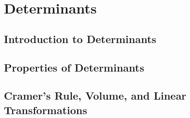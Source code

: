 \documentclass[../linalg.tex]{subfiles}
\begin{document}
\chapter{Determinants}
\section{Introduction to Determinants}
\section{Properties of Determinants}
\section{Cramer's Rule, Volume, and Linear Transformations}
\end{document}
